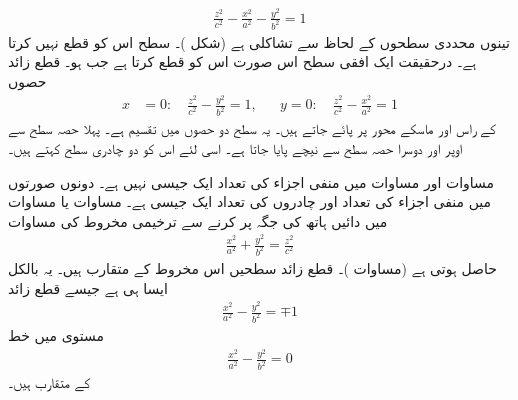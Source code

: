 \begin{align}\label{مساوات_سمتیہ_دو_چادری_قطع_زائد}
\frac{z^2}{c^2}-\frac{x^2}{a^2}-\frac{y^2}{b^2}=1
\end{align}
تینوں محددی سطحوں کے لحاظ سے تشاکلی ہے (شکل )۔ سطح   اس کو قطع  نہیں کرتا ہے۔ درحقیقت ایک افقی سطح اس صورت اس کو قطع کرتا ہے جب  ہو۔ قطع زائد حصوں
 \begin{align*}
x&=0:\quad\frac{z^2}{c^2}-\frac{y^2}{b^2}=1,&& y=0:\quad \frac{z^2}{c^2}-\frac{x^2}{a^2}=1
\end{align*}
کے راس اور ماسکے محور  پر پائے  جاتے ہیں۔ یہ سطح دو حصوں میں تقسیم ہے۔ پہلا حصہ سطح  سے اوپر اور دوسرا حصہ سطح  سے نیچے پایا جاتا ہے۔ اسی لئے اس کو دو چادری سطح کہتے ہیں۔

مساوات  اور مساوات  میں منفی اجزاء کی تعداد ایک جیسی نہیں ہے۔ دونوں  صورتوں میں منفی اجزاء کی تعداد اور چادروں کی تعداد ایک جیسی ہے۔   مساوات  یا  مساوات  میں دائیں ہاتھ  کی جگہ   پر کرنے سے ترخیمی مخروط کی مساوات
\begin{align*}
\frac{x^2}{a^2}+\frac{y^2}{b^2}=\frac{z^2}{c^2}
\end{align*}
حاصل ہوتی ہے (مساوات )۔ قطع زائد سطحیں اس مخروط کے متقارب ہیں۔ یہ بالکل ایسا ہی ہے جیسے قطع زائد
\begin{align*}
\frac{x^2}{a^2}-\frac{y^2}{b^2}=\mp 1
\end{align*}
مستوی  میں  خط
\begin{align*}
\frac{x^2}{a^2}-\frac{y^2}{b^2}=0
\end{align*}
کے متقارب ہیں۔


